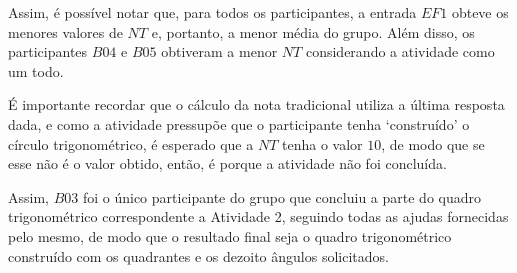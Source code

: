 Assim, é possível notar que, para todos os participantes, a entrada $EF1$ obteve os menores valores de $NT$ e, portanto, a menor média do grupo. Além disso, os participantes $B04$ e $B05$ obtiveram a menor $NT$ considerando a atividade como um todo.

É importante recordar que o cálculo da nota tradicional utiliza a última resposta dada, e como a atividade pressupõe que o participante tenha `construído' o círculo trigonométrico, é esperado que a $NT$ tenha o valor $10$, de modo que se esse não é o valor obtido, então, é porque a atividade não foi concluída.

Assim, $B03$ foi o único participante do grupo que concluiu a parte do quadro trigonométrico correspondente a Atividade 2, seguindo todas as ajudas fornecidas pelo mesmo, de modo que o resultado final seja o quadro trigonométrico construído com os quadrantes e os dezoito ângulos solicitados.

